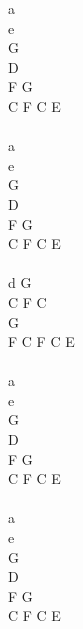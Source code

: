 \documentclass[a5paper, 10pt]{book}
\begin{document}
\begin{minipage}[t]{0.5\textwidth}
a\\
e\\
G\\
D\\
F G\\
C F C E\\
\\
a\\
e\\
G\\
D\\
F G\\
C F C E\\
\\
d G\\
C F C\\
G\\
F C F C E\\
\\
a\\
e\\
G\\
D\\
F G\\
C F C E\\
\\
a\\
e\\
G\\
D\\
F G\\
C F C E\\
\end{minipage}

\newpage
\end{document}
